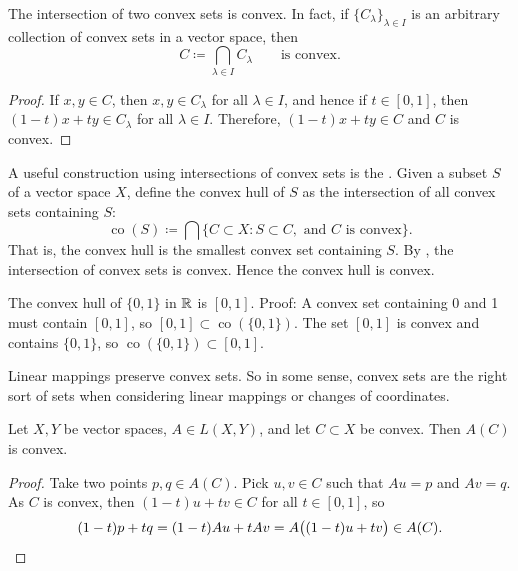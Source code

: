 \begin{prop} \label{prop:intersectionconvex}
The intersection of two convex sets is convex.  In fact,
if $\{ C_\lambda \}_{\lambda \in I}$ is
an arbitrary collection of convex sets in a vector space, then
\begin{equation*}
C \coloneqq \bigcap_{\lambda \in I} C_\lambda
\qquad \text{is convex.}
\end{equation*}
\end{prop}

\begin{proof}
If $x, y \in C$, then $x,y \in C_\lambda$ for all
$\lambda \in I$, and hence if $t \in [0,1]$, then $(1-t)x + ty \in
C_\lambda$ for all $\lambda \in I$.  Therefore, $(1-t)x + ty \in C$ and $C$
is convex.
\end{proof}

A useful construction using intersections of convex sets is the
\emph{}.  Given a subset $S$ of a vector
space $X$, define the convex hull of $S$ as the intersection of all convex sets
containing $S$:
\begin{equation*}
\operatorname{co}(S) \coloneqq
\bigcap \{ C \subset X : S \subset C, \text{ and } C \text{ is convex} \} .
\end{equation*}
That is, the convex hull is the smallest convex set containing $S$.  
By , the intersection of convex sets is
convex.
Hence the convex hull is convex.

\begin{example}
The convex hull of $\{ 0, 1 \}$ in ${\mathbb{R}}$ is $[0,1]$.  Proof:
A convex set containing 0 and 1 must contain $[0,1]$, so
$[0,1] \subset \operatorname{co}(\{0,1\})$.
The set $[0,1]$ is convex and contains $\{0,1\}$, so
$\operatorname{co}(\{0,1\}) \subset [0,1]$.
\end{example}

Linear mappings preserve convex sets.  So in some sense, convex sets are the
right sort of sets when considering linear mappings or changes of
coordinates.

\begin{prop}
Let $X,Y$ be vector spaces, $A \in L(X,Y)$, and let $C \subset X$ be convex.
Then $A(C)$ is convex.
\end{prop}

\begin{proof}
Take two points $p,q \in A(C)$.  Pick $u,v \in C$ such that
$Au = p$ and $Av=q$.  As $C$ is convex, then
$(1-t)u+t v \in C$
for all $t \in [0,1]$, so
\begin{equation*}
(1-t)p+t q 
=
(1-t)Au+tAv
=
A\bigl((1-t)u+tv\bigr)
\in A(C) .  \qedhere
\end{equation*}
\end{proof}


